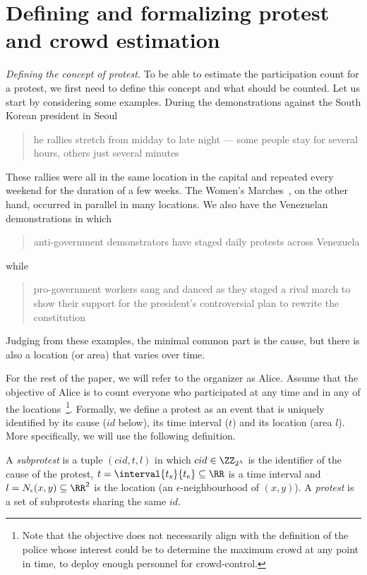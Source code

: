 \section{Defining and formalizing protest and crowd estimation}%
\label{SystemModel}


\emph{Defining the concept of protest.} To be able to estimate the participation count for a protest, we first need to define this concept and what should be counted.
Let us start by considering some examples.
During the demonstrations against the South Korean president in Seoul
\blockcquote{2016DemonstrationsInSeoul}{%
  he rallies stretch from midday to late night --- some people stay for several hours, others just several minutes%
}.
These rallies were all in the same location in the capital and repeated every 
weekend for the duration of a few weeks.
The Women's Marches~\cite{2017WomensMarchesInUS}, on the other hand, occurred in parallel in many locations.
We also have the Venezuelan demonstrations in which
\blockcquote{2017VenezuelaProtestFrequency}{%
  anti-government demonstrators have staged daily protests across Venezuela%
} while
\blockcquote{AlJazeeraOnVenezuela2017}{%
  pro-government workers sang and danced as they staged a rival march to show their support for the president's controversial plan to rewrite the constitution%
}.
Judging from these examples, the minimal common part is the cause,%
\label{CauseIsTheCommonDenominator} but there is also a location (or area) that varies over time.

For the rest of the paper, we will refer to the organizer as Alice.
Assume that the objective of Alice is to count everyone who participated at any time and in any of the locations~\cite{2016DemonstrationsInSeoul}\footnote{Note that the objective does not necessarily align with the definition of the police whose interest could be to determine the maximum crowd at any point in time, to deploy enough personnel for crowd-control.}.
Formally, we define a protest as an event that is uniquely identified by its cause (\(id\) below), its time interval (\(t\)) and its location (area \(l\)).
More specifically, we will use the following definition.

\begin{definition}[Protest]\label{DefProtest}
  A \emph{subprotest} is a tuple \((cid, t, l)\) in which \(cid\in 
    \ZZ_{2^\lambda}\) is the identifier of the cause of the protest,
  \(t = \interval{t_s}{t_e}\subseteq \RR\) is a time interval and \(l = 
    N_\epsilon(x, y)\subseteq \RR^2\) is the location (an 
  \(\epsilon\)-neighbourhood of \((x,y)\)).
  A \emph{protest} is a set of subprotests sharing the same \(id\).
\end{definition}

